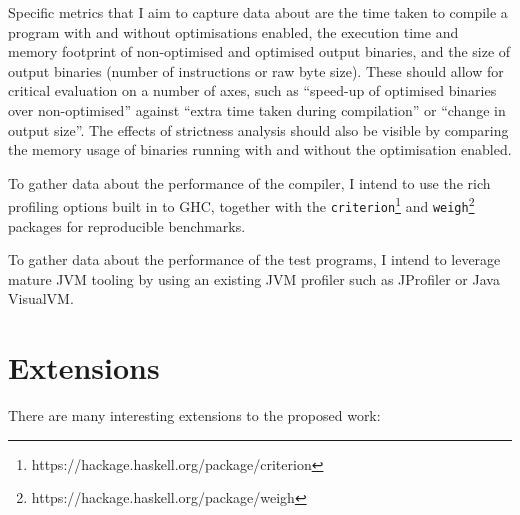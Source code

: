 \documentclass[12pt]{article}
\newcommand\monospace[1]{\texttt{#1}}
\begin{document}
Specific metrics that I aim to capture data about are the time taken to compile a program with and without optimisations
enabled, the execution time and memory footprint of non-optimised and optimised output binaries, and the size of output
binaries (number of instructions or raw byte size). These should allow for critical evaluation on a number of axes, such
as ``speed-up of optimised binaries over non-optimised'' against ``extra time taken during compilation'' or ``change in
output size''. The effects of strictness analysis should also be visible by comparing the memory usage of binaries
running with and without the optimisation enabled.

To gather data about the performance of the compiler, I intend to use the rich profiling options built in to GHC,
together with the \monospace{criterion}\footnote{https://hackage.haskell.org/package/criterion} and
\monospace{weigh}\footnote{https://hackage.haskell.org/package/weigh} packages for reproducible benchmarks.

To gather data about the performance of the test programs, I intend to leverage mature JVM tooling by using an existing
JVM profiler such as JProfiler or Java VisualVM.

\section*{Extensions}

There are many interesting extensions to the proposed work:
\end{document}
